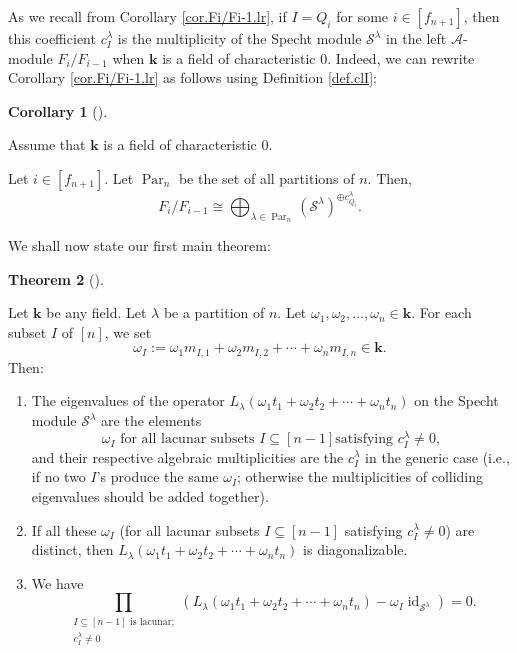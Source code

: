 \documentclass[numbers=enddot,12pt,final,onecolumn,notitlepage]{scrartcl}%
\theoremstyle{definition}
\newtheorem{theo}{Theorem}[section]
\newenvironment{theorem}[1][]
{\begin{theo}[#1]\begin{leftbar}}
{\end{leftbar}\end{theo}}
\newtheorem{coro}[theo]{Corollary}
\newenvironment{corollary}[1][]
{\begin{coro}[#1]\begin{leftbar}}
{\end{leftbar}\end{coro}}
\let\prodnonlimits\prod
\renewcommand{\prod}{\prodnonlimits\limits}
\begin{document}
As we recall from Corollary \ref{cor.Fi/Fi-1.lr}, if $I=Q_{i}$ for some
$i\in\left[  f_{n+1}\right]  $, then this coefficient $c_{I}^{\lambda}$ is the
multiplicity of the Specht module $\mathcal{S}^{\lambda}$ in the left
$\mathcal{A}$-module $F_{i}/F_{i-1}$ when $\mathbf{k}$ is a field of
characteristic $0$. Indeed, we can rewrite Corollary \ref{cor.Fi/Fi-1.lr} as
follows using Definition \ref{def.clI}:

\begin{corollary}
\label{cor.Fi/Fi-1.lr-rewr}Assume that $\mathbf{k}$ is a field of
characteristic $0$.

Let $i\in\left[  f_{n+1}\right]  $. Let $\operatorname*{Par}\nolimits_{n}$ be
the set of all partitions of $n$. Then,%
\[
F_{i}/F_{i-1}\cong\bigoplus_{\lambda\in\operatorname*{Par}\nolimits_{n}%
}\left(  \mathcal{S}^{\lambda}\right)  ^{\oplus c_{Q_{i}}^{\lambda}}.
\]

\end{corollary}

We shall now state our first main theorem:


\begin{theorem}
\label{thm.eigs}Let $\mathbf{k}$ be any field. Let $\lambda$ be a partition of
$n$. Let $\omega_{1},\omega_{2},\ldots,\omega_{n}\in\mathbf{k}$. For each
subset $I$ of $\left[  n\right]  $, we set%
\[
\omega_{I}:=\omega_{1}m_{I,1}+\omega_{2}m_{I,2}+\cdots+\omega_{n}m_{I,n}%
\in\mathbf{k}.
\]
Then:

\begin{enumerate}
\item[\textbf{(a)}] The eigenvalues of the operator $L_{\lambda}\left(
\omega_{1}t_{1}+\omega_{2}t_{2}+\cdots+\omega_{n}t_{n}\right)  $ on the Specht
module $\mathcal{S}^{\lambda}$ are the elements%
\begin{equation}
\omega_{I}\text{ for all lacunar subsets }I\subseteq\left[  n-1\right]  \text{
satisfying }c_{I}^{\lambda}\neq0,\nonumber
\end{equation}
and their respective algebraic multiplicities are the $c_{I}^{\lambda}$ in the
generic case (i.e., if no two $I$'s produce the same $\omega_{I}$; otherwise
the multiplicities of colliding eigenvalues should be added together).

\item[\textbf{(b)}] If all these $\omega_{I}$ (for all lacunar subsets
$I\subseteq\left[  n-1\right]  $ satisfying $c_{I}^{\lambda}\neq0$) are
distinct, then $L_{\lambda}\left(  \omega_{1}t_{1}+\omega_{2}t_{2}%
+\cdots+\omega_{n}t_{n}\right)  $ is diagonalizable.

\item[\textbf{(c)}] We have%
\[
\prod_{\substack{I\subseteq\left[  n-1\right]  \text{ is lacunar;}%
\\c_{I}^{\lambda}\neq0}}\left(  L_{\lambda}\left(  \omega_{1}t_{1}+\omega
_{2}t_{2}+\cdots+\omega_{n}t_{n}\right)  -\omega_{I}\operatorname*{id}%
\nolimits_{\mathcal{S}^{\lambda}}\right)  =0.
\]

\end{enumerate}
\end{theorem}
\end{document}
